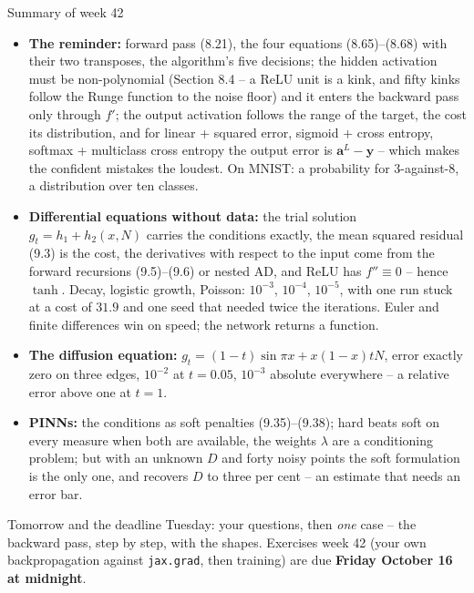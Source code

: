 \documentclass[10pt,aspectratio=169]{beamer}
\begin{document}
\begin{frame}{Summary of week 42}
\footnotesize
\begin{itemize}
  \item \textbf{The reminder:} forward pass (8.21), the four equations
        (8.65)--(8.68) with their two transposes, the algorithm's five
        decisions; the hidden activation must be non-polynomial (Section 8.4
        -- a ReLU unit is a kink, and fifty kinks follow the Runge function
        to the noise floor) and it enters the backward pass only through
        $f'$; the output activation follows the range of the target, the
        cost its distribution, and for linear + squared error, sigmoid +
        cross entropy, softmax + multiclass cross entropy the output error
        is $\bm{a}^{L}-\bm{y}$ -- which makes the confident mistakes the
        loudest.  On MNIST: a probability for 3-against-8, a distribution
        over ten classes.
  \item \textbf{Differential equations without data:} the trial solution
        $g_t=h_1+h_2(x,N)$ carries the conditions exactly, the mean squared
        residual (9.3) is the cost, the derivatives with respect to the
        input come from the forward recursions (9.5)--(9.6) or nested AD,
        and ReLU has $f''\equiv0$ -- hence $\tanh$.  Decay, logistic
        growth, Poisson: $10^{-3}$, $10^{-4}$, $10^{-5}$, with one run
        stuck at a cost of $31.9$ and one seed that needed twice the
        iterations.  Euler and finite differences win on speed; the network
        returns a function.
  \item \textbf{The diffusion equation:} $g_t=(1-t)\sin\pi x+x(1-x)tN$,
        error exactly zero on three edges, $10^{-2}$ at $t=0.05$, $10^{-3}$
        absolute everywhere -- a relative error above one at $t=1$.
  \item \textbf{PINNs:} the conditions as soft penalties (9.35)--(9.38);
        hard beats soft on every measure when both are available, the
        weights $\lambda$ are a conditioning problem; but with an unknown
        $D$ and forty noisy points the soft formulation is the only one, and
        recovers $D$ to three per cent -- an estimate that needs an error
        bar.
\end{itemize}
\begin{block}{Tomorrow and the deadline}
Tuesday: your questions, then \emph{one} case -- the backward pass, step by
step, with the shapes.  Exercises week 42 (your own backpropagation against
\texttt{jax.grad}, then training) are due \textbf{Friday October 16 at midnight}.
\end{block}
\end{frame}
\end{document}
